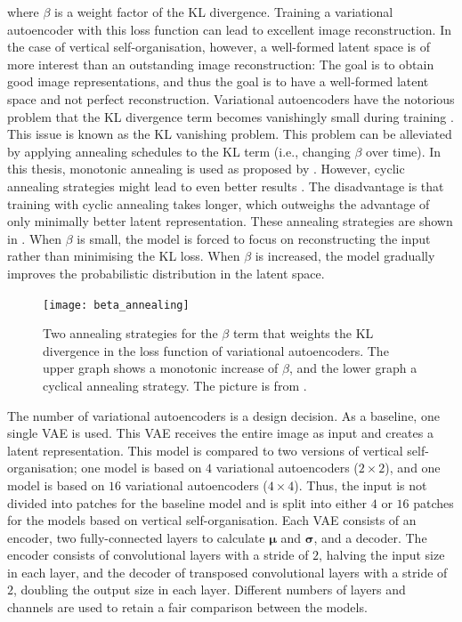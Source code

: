 where $\beta$ is a weight factor of the KL divergence. Training a variational autoencoder with this loss function can lead to excellent image reconstruction.
In the case of vertical self-organisation, however, a well-formed latent space is of more interest than an outstanding image reconstruction: The goal is to obtain good image representations, and thus the goal is to have a well-formed latent space and not perfect reconstruction.
Variational autoencoders have the notorious problem that the KL divergence term becomes vanishingly small during training . This issue is known as the KL vanishing problem.
This problem can be alleviated by applying annealing schedules to the KL term (i.e., changing $\beta$ over time).
In this thesis, monotonic annealing is used as proposed by .
However, cyclic annealing strategies might lead to even better results .
The disadvantage is that training with cyclic annealing takes longer, which outweighs the advantage of only minimally better latent representation.
These annealing strategies are shown in . When $\beta$ is small, the model is forced to focus on reconstructing the input rather than minimising the KL loss.
When $\beta$ is increased, the model gradually improves the probabilistic distribution in the latent space.

\begin{figure}[h]
    \centering
    \texttt{[image: beta\_annealing]}
    \caption[Annealing strategy of the KL weight term of variational autoencoders]{Two annealing strategies for the $\beta$ term that weights the KL divergence in the loss function of variational autoencoders. The upper graph shows a monotonic increase of $\beta$, and the lower graph a cyclical annealing strategy. The picture is from \cite{Fu_Li_Liu_Gao_Celikyilmaz_Carin_2019}.}
\end{figure}

The number of variational autoencoders is a design decision. As a baseline, one single VAE is used. This VAE receives the entire image as input and creates a latent representation. This model is compared to two versions of vertical self-organisation; one model is based on $4$ variational autoencoders ($2 \times 2$), and one model is based on $16$ variational autoencoders ($4 \times 4$). Thus, the input is not divided into patches for the baseline model and is split into either $4$ or $16$ patches for the models based on vertical self-organisation.
Each VAE consists of an encoder, two fully-connected layers to calculate $\boldsymbol{\mu}$ and $\boldsymbol{\sigma}$, and a decoder. The encoder consists of convolutional layers with a stride of $2$, halving the input size in each layer, and the decoder of transposed convolutional layers with a stride of $2$, doubling the output size in each layer.
Different numbers of layers and channels are used to retain a fair comparison between the models.

